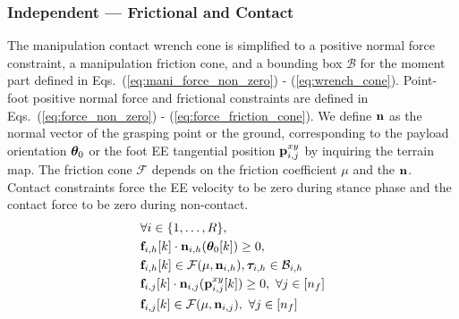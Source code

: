 \subsubsection{Independent --- \textbf{Frictional and Contact}}
The manipulation contact wrench cone is simplified to a positive normal force constraint, a manipulation friction cone, and a bounding box $\mathcal{B}$ for the moment part defined in Eqs.~(\ref{eq:mani_force_non_zero}) - (\ref{eq:wrench_cone}).
Point-foot positive normal force and frictional constraints are defined in Eqs.~(\ref{eq:force_non_zero}) - (\ref{eq:force_friction_cone}). We define $\mathbf{n}$ as the normal vector of the grasping point or the ground, corresponding to the payload orientation $\bm{\theta}_0$ or the foot EE tangential position $\mathbf{p}^{xy}_{i,j}$ by inquiring the terrain map. The friction cone $\mathcal{F}$ depends on the friction coefficient $\mu$ and the $\mathbf{n}$. Contact constraints force the EE velocity to be zero during stance phase and the contact force to be zero during non-contact. 
\begin{subequations}
\begin{align}
    \nonumber &\forall i \in \{1,\dots,R\},\\\label{eq:mani_force_non_zero}
    & \mathbf{f}_{i,h}[k] \cdot \mathbf{n}_{i,h}(\bm{\theta}_0[k]) \ge 0,\\
    \label{eq:wrench_cone}
        & \mathbf{f}_{i,h}[k] \in \mathcal{F}(\mu, \mathbf{n}_{i,h}), \bm{\tau}_{i,h} \in \mathcal{B}_{i,h}
        \\\label{eq:force_non_zero}
    & \mathbf{f}_{i,j}[k] \cdot \mathbf{n}_{i,j}(\mathbf{p}_{i,j}^{xy}[k]) \ge 0,
    \ \forall j \in [n_f]
    \\\label{eq:force_friction_cone}
        & \mathbf{f}_{i,j}[k] \in \mathcal{F}(\mu, \mathbf{n}_{i,j}), 
        \ \forall j \in [n_f]
\end{align}
\end{subequations}

